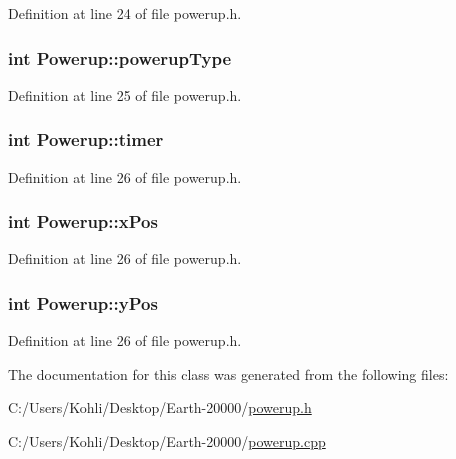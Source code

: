 Definition at line 24 of file powerup.h.\hypertarget{class_powerup_abd54a06f5c3f0eccf117e3e66ac4eed6}{
\subsubsection[{powerupType}]{\setlength{\rightskip}{0pt plus 5cm}int {\bf Powerup::powerupType}}}
\label{class_powerup_abd54a06f5c3f0eccf117e3e66ac4eed6}


Definition at line 25 of file powerup.h.\hypertarget{class_powerup_a0c32c5cedef96b3fd45c4d9474e1379c}{
\subsubsection[{timer}]{\setlength{\rightskip}{0pt plus 5cm}int {\bf Powerup::timer}}}
\label{class_powerup_a0c32c5cedef96b3fd45c4d9474e1379c}


Definition at line 26 of file powerup.h.\hypertarget{class_powerup_a504173661ebda0dad5527d8da3db112a}{
\subsubsection[{xPos}]{\setlength{\rightskip}{0pt plus 5cm}int {\bf Powerup::xPos}}}
\label{class_powerup_a504173661ebda0dad5527d8da3db112a}


Definition at line 26 of file powerup.h.\hypertarget{class_powerup_a5c5ead355eac87687262e9016f771309}{
\subsubsection[{yPos}]{\setlength{\rightskip}{0pt plus 5cm}int {\bf Powerup::yPos}}}
\label{class_powerup_a5c5ead355eac87687262e9016f771309}


Definition at line 26 of file powerup.h.

The documentation for this class was generated from the following files:\begin{DoxyCompactItemize}
\item 
C:/Users/Kohli/Desktop/Earth-\/20000/\hyperlink{powerup_8h}{powerup.h}\item 
C:/Users/Kohli/Desktop/Earth-\/20000/\hyperlink{powerup_8cpp}{powerup.cpp}\end{DoxyCompactItemize}

